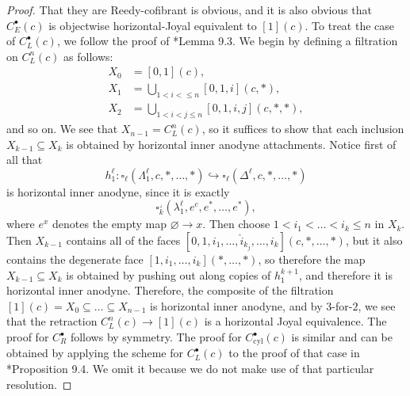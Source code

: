 \documentclass[leqno]{article}
\numberwithin{equation}{subsection}
\theoremstyle{plain}   %
\newtheorem{cor}[equation]{Corollary}
\theoremstyle{remark}
\theoremstyle{plain}
\newcommand{\cellset}{\ensuremath{\widehat{\Theta[\mathcal{C}]}}}
\begin{document}
\begin{proof}
	That they are Reedy-cofibrant is obvious, and it is also obvious that \(C^\bullet_E(c)\) is objectwise horizontal-Joyal equivalent to \([1](c)\). 	To treat the case of \(C^\bullet_L(c)\), we follow the proof of \cite{ds2}*{Lemma 9.3}. We begin by defining a filtration on \(C^n_L(c)\) as follows: 
	\begin{align*}
		X_0 &= [0,1](c), \\
		X_1 &= \bigcup_{1< i <\leq n} [0,1,i](c,\ast), \\
		X_2 &= \bigcup_{1< i < j \leq n} [0,1,i,j](c,\ast,\ast),  
	\end{align*}
	and so on.  We see that \(X_{n-1}=C^n_L(c)\), so it suffices to show that each inclusion \(X_{k-1} \subseteq X_{k}\) is obtained by horizontal inner anodyne attachments.  Notice first of all that 
	\[h^\ell_1:\square_\ell(\Lambda^\ell_1,c,\ast,\dots,\ast)\hookrightarrow \square_\ell(\Delta^\ell,c,\ast,\dots,\ast)\] is horizontal inner anodyne, since it is exactly \[\square^\lrcorner_k(\lambda^\ell_1,e^{c},e^\ast,\dots,e^\ast),\] where \(e^x\) denotes the empty map \(\varnothing \to x\).
	Then choose \(1< i_1 < \dots < i_k \leq n\) in \(X_k\).  Then \(X_{k-1}\) contains all of the faces \([0,1,i_1,\dots, \hat{i}_{k_j},\dots,i_k](c,\ast,\dots,\ast)\), but it also contains the degenerate face \([1,i_1,\dots,i_k](\ast,\dots,\ast)\), so therefore the map \(X_{k-1} \subseteq X_k\) is obtained by pushing out along copies of \(h^{k+1}_1\), and therefore it is horizontal inner anodyne.  Therefore, the composite of the filtration \([1](c)=X_0 \subseteq \dots \subseteq X_{n-1}\) is horizontal inner anodyne, and by \(3\)-for-\(2\), we see that the retraction \(C^n_L(c) \to [1](c)\) is a horizontal Joyal equivalence.  The proof for \(C^\bullet_R\) follows by symmetry. 
	The proof for \(C^\bullet_{\mathrm{cyl}}(c)\) is similar and can be obtained by applying the scheme for \(C^\bullet_L(c)\) to the proof of that case in \cite{ds2}*{Proposition 9.4}. We omit it because we do not make use of that particular resolution.
\end{proof}
\begin{comment}
	\begin{cor}
		Each of the functors \(C^n_\mathrm{cyl}(\bullet), C^n_R(\bullet), C^n_L(\bullet), C^n_E(\bullet)\) defines a rank-\(1\) 	gadget for each \(n\geq 0\).
	\end{cor}
	\begin{proof}
		Since \(\mathfrak{C}\) is left-Quillen, it preserves weak equivalences between cofibrant objects in \(\cellset\).  It 	follows that since for each \(n\geq 0\) we have that \(C^n_{-}(\bullet)\to [1](\bullet)\) is a weak equivalence, then
		\[\mathfrak{C}(C^n_{-}(\bullet))(\alpha,\omega) \to \mathfrak{C}([1](\bullet))(\alpha,\omega)=\bullet\]
		is a weak equivalence, so we have the natural zig-zag we require.
	\end{proof}
\end{comment}
\end{document}
